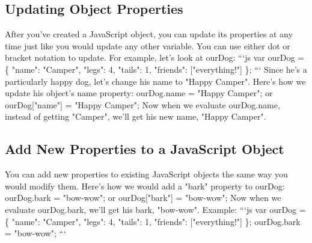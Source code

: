 \documentclass{article}%
\begin{document}
\subsection{Updating Object Properties}%
\label{subsec:UpdatingObjectProperties}%
After you've created a JavaScript object, you can update its properties at any time just like you would update any other variable. You can use either dot or bracket notation to update.\newline%
For example, let's look at ourDog:\newline%
```js\newline%
var ourDog = \{\newline%
  "name": "Camper",\newline%
  "legs": 4,\newline%
  "tails": 1,\newline%
  "friends": {[}"everything!"{]}\newline%
\};\newline%
```\newline%
Since he's a particularly happy dog, let's change his name to "Happy Camper". Here's how we update his object's name property:\newline%
ourDog.name = "Happy Camper"; or\newline%
ourDog{[}"name"{]} = "Happy Camper";\newline%
Now when we evaluate ourDog.name, instead of getting "Camper", we'll get his new name, "Happy Camper".\newline%

%
\subsection{Add New Properties to a JavaScript Object}%
\label{subsec:AddNewPropertiestoaJavaScriptObject}%
You can add new properties to existing JavaScript objects the same way you would modify them.\newline%
Here's how we would add a "bark" property to ourDog:\newline%
ourDog.bark = "bow{-}wow";\newline%
or\newline%
ourDog{[}"bark"{]} = "bow{-}wow";\newline%
Now when we evaluate ourDog.bark, we'll get his bark, "bow{-}wow".\newline%
Example:\newline%
```js\newline%
var ourDog = \{\newline%
  "name": "Camper",\newline%
  "legs": 4,\newline%
  "tails": 1,\newline%
  "friends": {[}"everything!"{]}\newline%
\};\newline%
ourDog.bark = "bow{-}wow";\newline%
```\newline%
\end{document}
